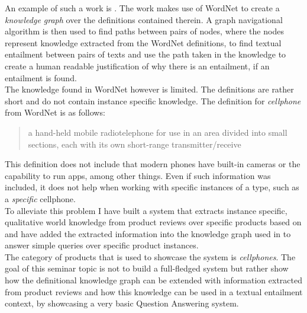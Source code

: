 An example of such a work is \cite{silva2018recognizing}. The work makes use of WordNet \cite{miller1995wordnet} to create a \textit{knowledge graph} over the definitions contained therein. A graph navigational algorithm is then used to find paths between pairs of nodes, where the nodes represent knowledge extracted from the WordNet definitions, to find textual entailment between pairs of texts and use the path taken in the knowledge to create a human readable justification of why there is an entailment, if an entailment is found.\\
The knowledge found in WordNet however is limited. The definitions are rather short and do not contain instance specific knowledge. The definition for \textit{cellphone} from WordNet is as follows:
\begin{quote}
a hand-held mobile radiotelephone for use in an area divided into small sections, each with its own short-range transmitter/receive
\end{quote}
This definition does not include that modern phones have built-in cameras or the capability to run apps, among other things. Even if such information was included, it does not help when working with specific instances of a type, such as a \textit{specific} cellphone.\\
To alleviate this problem I have built a system that extracts instance specific, qualitative world knowledge from product reviews over specific products based on \cite{scaffidi2007red} and have added the extracted information into the knowledge graph used in \cite{silva2018recognizing} to answer simple queries over specific product instances.\\
The category of products that is used to showcase the system is \textit{cellphones}. The goal of this seminar topic is not to build a full-fledged system but rather show how the definitional knowledge graph can be extended with information extracted from product reviews and how this knowledge can be used in a textual entailment context, by showcasing a very basic Question Answering system.